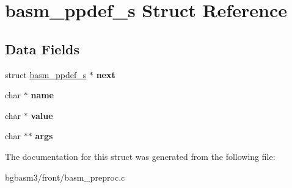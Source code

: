 \hypertarget{structbasm__ppdef__s}{\section{basm\-\_\-ppdef\-\_\-s Struct Reference}
\label{structbasm__ppdef__s}
}
\subsection*{Data Fields}
\begin{DoxyCompactItemize}
\item 
\hypertarget{structbasm__ppdef__s_a4cd3e431a99c24e71cf64a9d09260b27}{struct \hyperlink{structbasm__ppdef__s}{basm\-\_\-ppdef\-\_\-s} $\ast$ {\bfseries next}}\label{structbasm__ppdef__s_a4cd3e431a99c24e71cf64a9d09260b27}

\item 
\hypertarget{structbasm__ppdef__s_a3e281647b29f145494fd18202dce9902}{char $\ast$ {\bfseries name}}\label{structbasm__ppdef__s_a3e281647b29f145494fd18202dce9902}

\item 
\hypertarget{structbasm__ppdef__s_a7923ee39a679aa0237a431efb2dc97b1}{char $\ast$ {\bfseries value}}\label{structbasm__ppdef__s_a7923ee39a679aa0237a431efb2dc97b1}

\item 
\hypertarget{structbasm__ppdef__s_a08fd5b398bf51c26af19e773f70fba22}{char $\ast$$\ast$ {\bfseries args}}\label{structbasm__ppdef__s_a08fd5b398bf51c26af19e773f70fba22}

\end{DoxyCompactItemize}


The documentation for this struct was generated from the following file\-:\begin{DoxyCompactItemize}
\item 
bgbasm3/front/basm\-\_\-preproc.\-c\end{DoxyCompactItemize}
